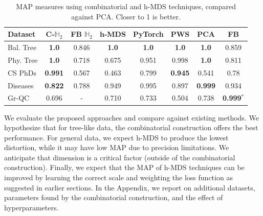 \begin{table}[h]
\centering
\begin{tabular}{|l||c|c||c|c|c|c|c|} \hline
  Dataset     	          &  C-$\mathbb{H}_2$ &  FB $\mathbb{H}_2$ & h-MDS & PyTorch & PWS & PCA & FB                  \\ \hline\hline
  Bal. Tree          & {\bf 1.0}              &    0.846    &    {\bf 1.0}    & {\bf 1.0} & {\bf 1.0}       &  {\bf 1.0}           & 0.859     \\ 
Phy. Tree          &      {\bf 1.0}                &    0.718  &   0.675    & 0.951 & 0.998          &    {\bf 1.0}          &       0.811     \\
\hline
\hline
CS PhDs              & {\bf 0.991}             &  0.567          &  0.463    &     0.799 & {\bf 0.945} &              0.541 & 0.78  \\ 
\hline\hline
Diseases              &      {\bf 0.822}             & 0.788          &     0.949    &  0.995  &  0.897      &         {\bf 0.999}      &    0.934\\
\hline
Gr-QC                          &    0.696      & -               &    0.710  & 0.733 & 0.504 &  0.738  &  {\bf 0.999}$^*$  \\ \hline 
\end{tabular}
\caption{MAP measures using combinatorial and h-MDS techniques, compared against PCA. %
Closer to 1 is better.}
\label{table:map_results}
\end{table}



We evaluate the proposed approaches and compare against
existing methods. We hypothesize that for tree-like data, the
combinatorial construction offers the best performance. For general
data, we expect h-MDS to produce the lowest distortion, while it may
have low MAP due to precision limitations. We anticipate that
dimension is a critical factor (outside of the combinatorial
construction). Finally, we expect that the MAP of h-MDS techniques can
be improved by learning the correct scale and weighting the loss
function as suggested in earlier sections. In the Appendix, we report
on additional datasets, parameters found by the combinatorial
construction, and the effect of hyperparameters.%

